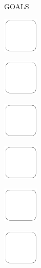 \documentclass[11pt,titlepage]{article}
\begin{document}
\pagebreak

\small
\hfill GOALS

\vspace{6mm}

\noindent
\includegraphics[]{checkbox-10mm.pdf}

\vspace{14,7mm}

\noindent
\includegraphics[]{checkbox-10mm.pdf}

\vspace{14,7mm}

\noindent
\includegraphics[]{checkbox-10mm.pdf}

\vspace{14,7mm}

\noindent
\includegraphics[]{checkbox-10mm.pdf}

\vspace{14,7mm}

\noindent
\includegraphics[]{checkbox-10mm.pdf}

\vspace{14,7mm}

\noindent
\includegraphics[]{checkbox-10mm.pdf}

\pagebreak
\end{document}
